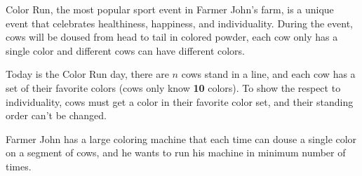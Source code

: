 Color Run, the most popular sport event in Farmer John's farm,
is a unique event that celebrates healthiness, happiness, and individuality.
During the event, cows will be doused from head to tail in colored powder,
each cow only has a single color and different cows can have different colors.

Today is the Color Run day, there are $n$ cows stand in a line,
and each cow has a set of their favorite colors (cows only know \textbf{10} colors).
To show the respect to individuality, cows must get a color in their favorite color set,
and their standing order can't be changed.

Farmer John has a large coloring machine that each time can douse a single color on a segment of cows,
and he wants to run his machine in minimum number of times.
